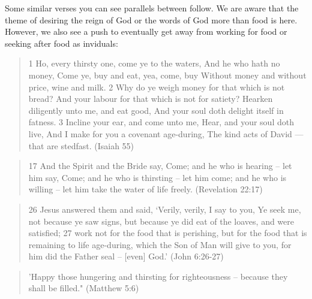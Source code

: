 \documentclass[11pt]{article}
\begin{document}
Some similar verses you can see parallels between follow. We are aware that the theme of desiring the reign of God or the words of God more than food is here. However, we also see a push to eventually get away from working for food or seeking after food as inviduals:
\begin{quote}
1 Ho, every thirsty one, come ye to the waters, And he who hath no money, Come ye, buy and eat, yea, come, buy Without money and without price, wine and milk.
2 Why do ye weigh money for that which is not bread? And your labour for that which is not for satiety? Hearken diligently unto me, and eat good, And your soul doth delight itself in fatness.
3 Incline your ear, and come unto me, Hear, and your soul doth live, And I make for you a covenant age-during, The kind acts of David — that are stedfast. (Isaiah 55)
\end{quote}
\begin{quote}
17 And the Spirit and the Bride say, Come; and he who is hearing -- let him say, Come; and he who is thirsting -- let him come; and he who is willing -- let him take the water of life freely. (Revelation 22:17)
\end{quote}
\begin{quote}
26 Jesus answered them and said, `Verily, verily, I say to you, Ye seek me, not because ye saw signs, but because ye did eat of the loaves, and were satisfied;
27 work not for the food that is perishing, but for the food that is remaining to life age-during, which the Son of Man will give to you, for him did the Father seal -- [even] God.' (John 6:26-27)
\end{quote}
\begin{quote}
'Happy those hungering and thirsting for righteousness -- because they shall be filled."
(Matthew 5:6)
\end{quote}



\end{document}
